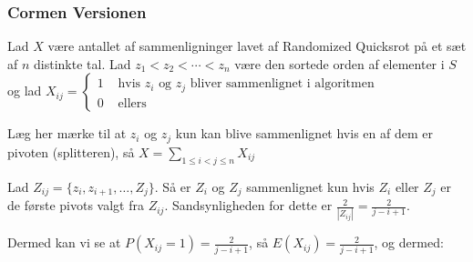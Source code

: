 \documentclass[11pt]{article}
\theoremstyle{definition}
\theoremstyle{remark}
\begin{document}
\subsubsection{Cormen Versionen}

Lad $X$ være antallet af sammenligninger lavet af Randomized Quicksrot på et sæt af $n$ distinkte tal. Lad $z_{1}< z_{2} < \cdots < z_{n}$ være den sortede orden af elementer i $S$ og lad $X_{ij} = \begin{cases}
  1 & \text{ hvis }z_{i} \text{ og }z_{j} \text{ bliver sammenlignet i algoritmen}\\
  0 & \text{ ellers}
\end{cases}$

Læg her mærke til at $z_{i}$ og $z_{j}$ kun kan blive sammenlignet hvis en af dem er pivoten (splitteren), så $X = \sum_{1 \leq i < j \leq n}^{}X_{ij}$

Lad $Z_{ij} = \{z_{i}, z_{i+1}, \ldots, Z_{j}  \}$. Så er $Z_{i}$ og $Z_{j}$ sammenlignet kun hvis $Z_{i}$ eller $Z_{j}$ er de første pivots valgt fra $Z_{ij}$. Sandsynligheden for dette er $\frac{2}{|Z_{ij}|} = \frac{2}{j-i+1}$.

Dermed kan vi se at $P(X_{ij}=1) = \frac{2}{j-i+1}$, så $E(X_{ij}) = \frac{2}{j-i+1}$, og dermed:
\end{document}
